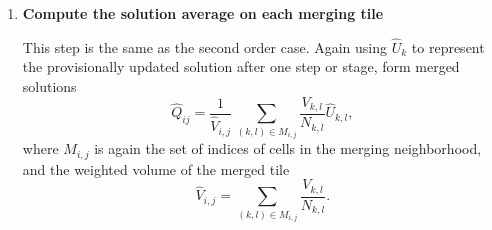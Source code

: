 \begin{enumerate}
\item 
\textbf{Compute the solution average on each merging tile}

This step is the same as the second order case.
Again using $\hat{U}_k$ to represent the provisionally updated 
solution after one step or stage, form merged solutions 
\begin{equation}\label{eq:q_avg1}
     \hat{Q}_{ij} =  \frac{1}{ \hat{V}_{i,j}} \,  \sum_{(k,l) \in M_{i,j} }\frac{V_{k,l}}{N_{k,l}} \hat{U}_{k,l},
\end{equation}
\noindent where $M_{i,j}$ is again the set of indices of cells in the 
merging neighborhood, and the weighted volume of the merged tile 
\begin{equation}\label{eq:modV}
\hat{V}_{i,j} = \sum_{(k,l) \in M_{i,j} }\frac{V_{k,l}}{N_{k,l}} .
\end{equation}


\end{enumerate}
